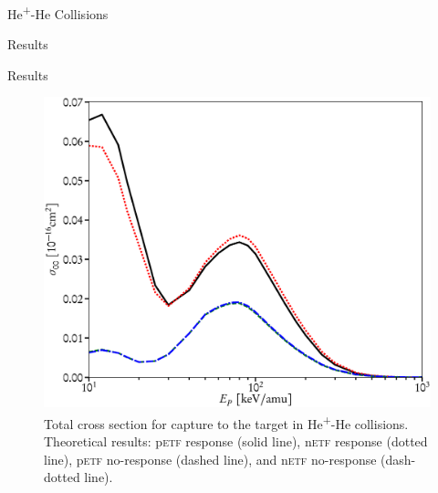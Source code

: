\documentclass[letterpaper, 11 pt]{report}
\begin{document}
\begin{chapter}{\texorpdfstring{He\textsuperscript{+}}{He+}-He Collisions \label{chap:hephe}}
\begin{section}{Results \label{sec:hephe-disc}}
\begin{subsection}{Results \label{sec:hephe-res}}
         \begin{figure}[t]
            \begin{minipage}{.49\linewidth}
               \centering
               \includegraphics[width = \linewidth]{./images/hephe-cross/HepHe-300.eps}
               \caption[Total cross section for capture to the target in He\textsuperscript{+}-He
                        collisions.]
                       {Total cross section for capture to the target in He\textsuperscript{+}-He
                        collisions.
                        Theoretical results: p\textsc{etf} response (solid line), n\textsc{etf} response
                                             (dotted line), p\textsc{etf} no-response (dashed line), and
                                             n\textsc{etf} no-response (dash-dotted line).
                        \label{fig:cs300}}
            \end{minipage} \hspace{0.009\linewidth} %
            \begin{minipage}{.49\linewidth}
               \centering

\end{minipage}
\end{figure}
\end{subsection}
\end{section}
\end{chapter}
\end{document}
